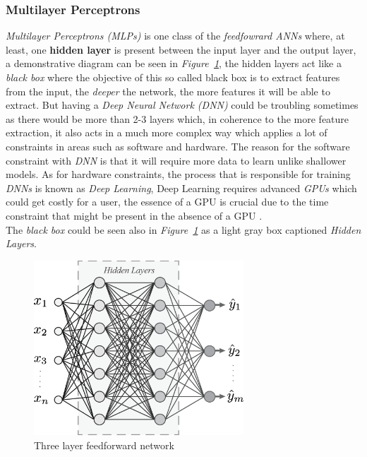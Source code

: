 \documentclass[12pt]{extarticle}
\begin{document}
	\subsubsection{Multilayer Perceptrons}\label{MLP}
	\emph{Multilayer Perceptrons (MLPs)} is one class of the \emph{feedfowrard ANNs} where, at least, one \textbf{hidden layer} is present between the input layer and the output layer, a demonstrative diagram can be seen in \emph{Figure~\ref{fig:MLP}}, the hidden layers act like a \emph{black box} where the objective of this so called black box is to extract features from the input, the \emph{deeper} the network, the more features it will be able to extract. But having a \emph{Deep Neural Network (DNN)} could be troubling sometimes as there would be more than 2-3 layers which, in coherence to the more feature extraction, it also acts in a much more complex way which applies a lot of constraints in areas such as software and hardware. The reason for the software constraint with \emph{DNN} is that it will require more data to learn unlike shallower models. As for hardware constraints, the process that is responsible for training \emph{DNNs} is known as \emph{Deep Learning}, Deep Learning requires advanced \emph{GPUs} which could get costly for a user, the essence of a GPU is crucial due to the time constraint that might be present in the absence of a GPU \cite{GPU}. \\[5mm]
	The \emph{black box} could be seen also in \emph{Figure~\ref{fig:MLP}} as a light gray box captioned \emph{Hidden Layers}. 
	
	\begin{figure}[h]
		\centering
		\includegraphics[width=0.7\textwidth]{pics/Figures/MLP.eps}
		\caption{\small{Three layer feedforward network}}
		\label{fig:MLP}
	\end{figure}
	
\end{document}
